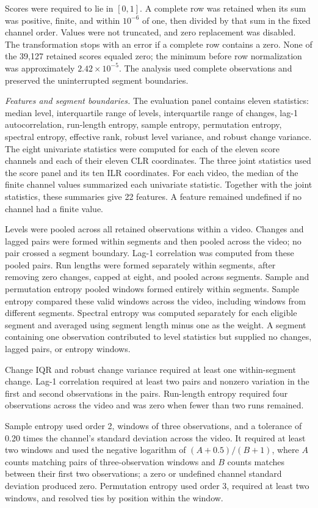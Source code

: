 \documentclass[
]{article}
\begin{document}
Scores were required to lie in \([0,1]\). A complete row was retained
when its sum was positive, finite, and within \(10^{-6}\) of one, then
divided by that sum in the fixed channel order. Values were not
truncated, and zero replacement was disabled. The transformation stops
with an error if a complete row contains a zero. None of the 39,127
retained scores equaled zero; the minimum before row normalization was
approximately \(2.42\times10^{-5}\). The analysis used complete
observations and preserved the uninterrupted segment boundaries.

\emph{Features and segment boundaries.} The evaluation panel contains
eleven statistics: median level, interquartile range of levels,
interquartile range of changes, lag-1 autocorrelation, run-length
entropy, sample entropy, permutation entropy, spectral entropy,
effective rank, robust level variance, and robust change variance. The
eight univariate statistics were computed for each of the eleven score
channels and each of their eleven CLR coordinates. The three joint
statistics used the score panel and its ten ILR coordinates. For each
video, the median of the finite channel values summarized each
univariate statistic. Together with the joint statistics, these
summaries give 22 features. A feature remained undefined if no channel
had a finite value.

Levels were pooled across all retained observations within a video.
Changes and lagged pairs were formed within segments and then pooled
across the video; no pair crossed a segment boundary. Lag-1 correlation
was computed from these pooled pairs. Run lengths were formed separately
within segments, after removing zero changes, capped at eight, and
pooled across segments. Sample and permutation entropy pooled windows
formed entirely within segments. Sample entropy compared these valid
windows across the video, including windows from different segments.
Spectral entropy was computed separately for each eligible segment and
averaged using segment length minus one as the weight. A segment
containing one observation contributed to level statistics but supplied
no changes, lagged pairs, or entropy windows.

Change IQR and robust change variance required at least one
within-segment change. Lag-1 correlation required at least two pairs and
nonzero variation in the first and second observations in the pairs.
Run-length entropy required four observations across the video and was
zero when fewer than two runs remained.

Sample entropy used order 2, windows of three observations, and a
tolerance of 0.20 times the channel's standard deviation across the
video. It required at least two windows and used the negative logarithm
of \((A+0.5)/(B+1)\), where \(A\) counts matching pairs of
three-observation windows and \(B\) counts matches between their first
two observations; a zero or undefined channel standard deviation
produced zero. Permutation entropy used order 3, required at least two
windows, and resolved ties by position within the window.
\end{document}
